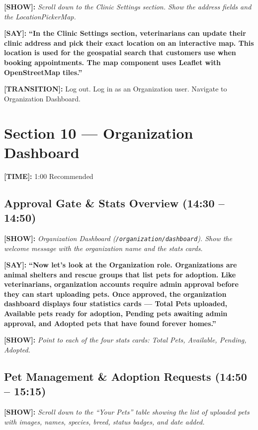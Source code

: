 \documentclass[12pt,a4paper]{article}
\newcommand{\say}[1]{\textbf{\textcolor{narration}{[SAY]:}} \textbf{``#1''}}
\newcommand{\show}[1]{\textbf{\textcolor{screen}{[SHOW]:}} \textit{#1}}
\newcommand{\timing}[1]{\textbf{\textcolor{timing}{[TIME]:}} #1}
\newcommand{\trans}[1]{\textbf{\textcolor{transition}{[TRANSITION]:}} #1}
\begin{document}
\show{Scroll down to the Clinic Settings section. Show the address fields and the LocationPickerMap.}

\say{In the Clinic Settings section, veterinarians can update their clinic address and pick their exact location on an interactive map. This location is used for the geospatial search that customers use when booking appointments. The map component uses Leaflet with OpenStreetMap tiles.}

\trans{Log out. Log in as an Organization user. Navigate to Organization Dashboard.}

\newpage

\section{Section 10 --- Organization Dashboard}
\label{sec:org-dash}

\timing{1:00} \hfill Recommended

\subsection{Approval Gate \& Stats Overview (14:30 -- 14:50)}

\show{Organization Dashboard (\texttt{/organization/dashboard}). Show the welcome message with the organization name and the stats cards.}

\say{Now let's look at the Organization role. Organizations are animal shelters and rescue groups that list pets for adoption. Like veterinarians, organization accounts require admin approval before they can start uploading pets. Once approved, the organization dashboard displays four statistics cards --- Total Pets uploaded, Available pets ready for adoption, Pending pets awaiting admin approval, and Adopted pets that have found forever homes.}

\show{Point to each of the four stats cards: Total Pets, Available, Pending, Adopted.}

\subsection{Pet Management \& Adoption Requests (14:50 -- 15:15)}

\show{Scroll down to the ``Your Pets'' table showing the list of uploaded pets with images, names, species, breed, status badges, and date added.}
\end{document}
